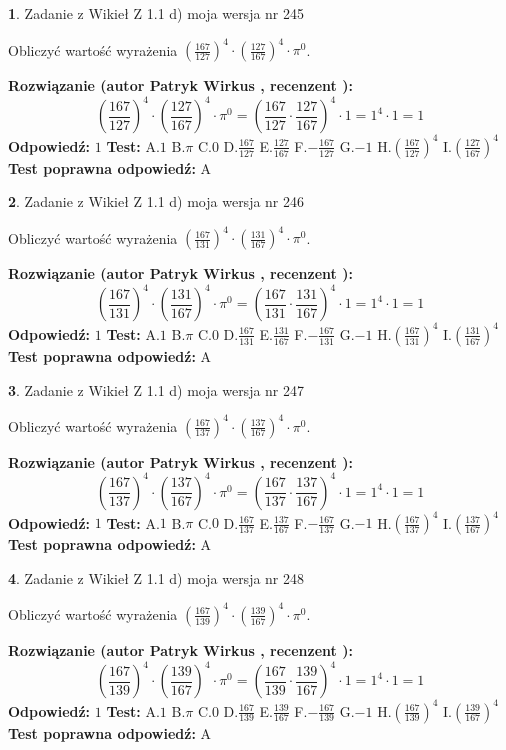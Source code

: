 \documentclass[12pt, a4paper]{article}
\theoremstyle{definition} %
\newtheorem{zad}{}
\newcommand{\zadStart}[1]{\begin{zad}#1\newline}
\newcommand{\zadStop}{\end{zad}}
\newcommand{\rozwStart}[2]{\noindent \textbf{Rozwiązanie (autor #1 , recenzent #2): }\newline}
\newcommand{\rozwStop}{\newline}
\newcommand{\odpStart}{\noindent \textbf{Odpowiedź:}\newline}
\newcommand{\odpStop}{\newline}
\newcommand{\testStart}{\noindent \textbf{Test:}\newline}
\newcommand{\testStop}{\newline}
\newcommand{\kluczStart}{\noindent \textbf{Test poprawna odpowiedź:}\newline}
\newcommand{\kluczStop}{\newline}
\begin{document}
\zadStart{Zadanie z Wikieł Z 1.1 d) moja wersja nr 245}

Obliczyć wartość wyrażenia $(\frac{167}{127})^{4} \cdot (\frac{127}{167})^{4} \cdot \pi^{0}$.
\zadStop
\rozwStart{Patryk Wirkus}{}
$$(\frac{167}{127})^{4} \cdot (\frac{127}{167})^{4} \cdot \pi^{0} = (\frac{167}{127} \cdot \frac{127}{167})^{4} \cdot 1 = 1^{4} \cdot 1 = 1$$
\rozwStop
\odpStart
$1$
\odpStop
\testStart
A.$1$ B.$\pi$ C.$0$ D.$\frac{167}{127}$ E.$\frac{127}{167}$
F.$-\frac{167}{127}$ G.$-1$
H.$(\frac{167}{127})^{4}$
I.$(\frac{127}{167})^{4}$
\testStop
\kluczStart
A
\kluczStop



\zadStart{Zadanie z Wikieł Z 1.1 d) moja wersja nr 246}

Obliczyć wartość wyrażenia $(\frac{167}{131})^{4} \cdot (\frac{131}{167})^{4} \cdot \pi^{0}$.
\zadStop
\rozwStart{Patryk Wirkus}{}
$$(\frac{167}{131})^{4} \cdot (\frac{131}{167})^{4} \cdot \pi^{0} = (\frac{167}{131} \cdot \frac{131}{167})^{4} \cdot 1 = 1^{4} \cdot 1 = 1$$
\rozwStop
\odpStart
$1$
\odpStop
\testStart
A.$1$ B.$\pi$ C.$0$ D.$\frac{167}{131}$ E.$\frac{131}{167}$
F.$-\frac{167}{131}$ G.$-1$
H.$(\frac{167}{131})^{4}$
I.$(\frac{131}{167})^{4}$
\testStop
\kluczStart
A
\kluczStop



\zadStart{Zadanie z Wikieł Z 1.1 d) moja wersja nr 247}

Obliczyć wartość wyrażenia $(\frac{167}{137})^{4} \cdot (\frac{137}{167})^{4} \cdot \pi^{0}$.
\zadStop
\rozwStart{Patryk Wirkus}{}
$$(\frac{167}{137})^{4} \cdot (\frac{137}{167})^{4} \cdot \pi^{0} = (\frac{167}{137} \cdot \frac{137}{167})^{4} \cdot 1 = 1^{4} \cdot 1 = 1$$
\rozwStop
\odpStart
$1$
\odpStop
\testStart
A.$1$ B.$\pi$ C.$0$ D.$\frac{167}{137}$ E.$\frac{137}{167}$
F.$-\frac{167}{137}$ G.$-1$
H.$(\frac{167}{137})^{4}$
I.$(\frac{137}{167})^{4}$
\testStop
\kluczStart
A
\kluczStop



\zadStart{Zadanie z Wikieł Z 1.1 d) moja wersja nr 248}

Obliczyć wartość wyrażenia $(\frac{167}{139})^{4} \cdot (\frac{139}{167})^{4} \cdot \pi^{0}$.
\zadStop
\rozwStart{Patryk Wirkus}{}
$$(\frac{167}{139})^{4} \cdot (\frac{139}{167})^{4} \cdot \pi^{0} = (\frac{167}{139} \cdot \frac{139}{167})^{4} \cdot 1 = 1^{4} \cdot 1 = 1$$
\rozwStop
\odpStart
$1$
\odpStop
\testStart
A.$1$ B.$\pi$ C.$0$ D.$\frac{167}{139}$ E.$\frac{139}{167}$
F.$-\frac{167}{139}$ G.$-1$
H.$(\frac{167}{139})^{4}$
I.$(\frac{139}{167})^{4}$
\testStop
\kluczStart
A
\kluczStop
\end{document}
